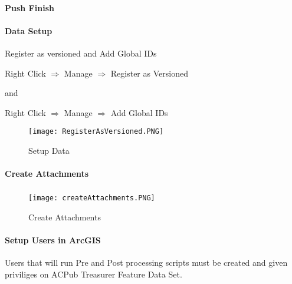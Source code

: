 \documentclass[class=book , crop=false, titlepage, twoside, multi={itemize, figure, verbatim}, float=false]{standalone}
\begin{document}
\paragraph*{\Large Push Finish}
%
\clearpage
%
%
%
\paragraph[Data Setup]{\Large Data Setup\texorpdfstring{\\}{}}
Register as versioned and Add Global IDs
\vspace{.2in}

{\large Right Click $\Rightarrow$ Manage $\Rightarrow$ Register as Versioned}
\vspace{.2in}

and
\vspace{.2in}

{\large Right Click $\Rightarrow$ Manage $\Rightarrow$ Add Global IDs}
\vspace{.2in}

%
%
\begin{figure}[h!]
\centering
    \texttt{[image: RegisterAsVersioned.PNG]}
\caption{Setup Data}
\end{figure}
%
%
\clearpage
%
%
%
\paragraph[Create Attachments]{\Large Create Attachments\texorpdfstring{\\}{}}

\vspace{.3in}

\subparagraph*{}
%
%
\begin{figure}[h!]
\centering
    \texttt{[image: createAttachments.PNG]}
\caption{Create Attachments}
\end{figure}
\clearpage
%
%
%
%
\paragraph[Setup Users in ArcGIS]{\Large Setup Users in ArcGIS\texorpdfstring{\\}{}}

Users that will run Pre and Post processing scripts must be created and given priviliges on ACPub Treasurer Feature Data Set.
\vspace{.5in}
\end{document}
